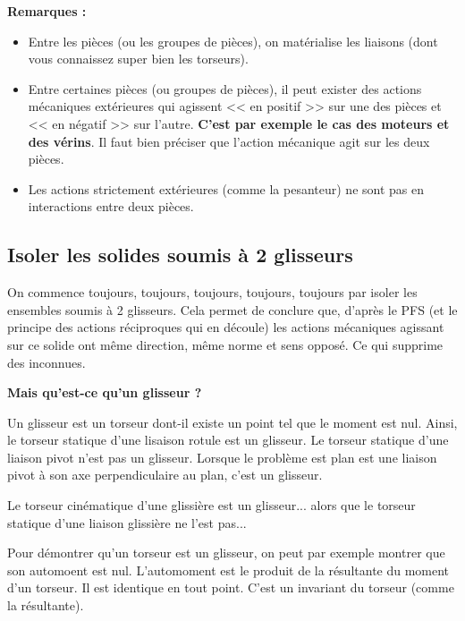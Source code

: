 \textbf{Remarques :}
\begin{itemize}
\item Entre les pièces (ou les groupes de pièces), on matérialise les liaisons (dont vous connaissez super bien les torseurs).
\item Entre certaines pièces (ou groupes de pièces), il peut exister des actions mécaniques extérieures qui agissent << en positif >> sur une des pièces et << en négatif >> sur l'autre. \textbf{C'est par exemple le cas des moteurs et des vérins}. Il faut bien préciser que l'action mécanique agit sur les deux pièces.
\item Les actions strictement extérieures (comme la pesanteur) ne sont pas en interactions entre deux pièces.
\end{itemize}


\subsection{Isoler les solides soumis à 2 glisseurs}

On commence toujours, \large{toujours}, \Large{toujours}, \LARGE{toujours}, \huge{toujours} \normalsize par isoler les ensembles soumis à 2 glisseurs. Cela permet de conclure que, d'après le PFS (et le principe des actions réciproques qui en découle) les actions mécaniques agissant sur ce solide ont même direction, même norme et sens opposé. Ce qui supprime des inconnues.

\textbf{Mais qu'est-ce qu'un glisseur ?}

Un glisseur est un torseur dont-il existe un point tel que le moment est nul. Ainsi, le torseur statique d'une lisaison rotule est un glisseur. Le torseur statique d'une liaison pivot n'est pas un glisseur. Lorsque le problème est plan est une liaison pivot à son axe perpendiculaire au plan, c'est un glisseur. 

Le torseur cinématique d'une glissière est un glisseur... alors que le torseur statique d'une liaison glissière ne l'est pas... 

\begin{rem}
Pour démontrer qu'un torseur est un glisseur, on peut par exemple montrer que son automoent est nul. L'automoment est le produit de la résultante du moment d'un torseur. Il est identique en tout point. C'est un invariant du torseur (comme la résultante).
\end{rem}

